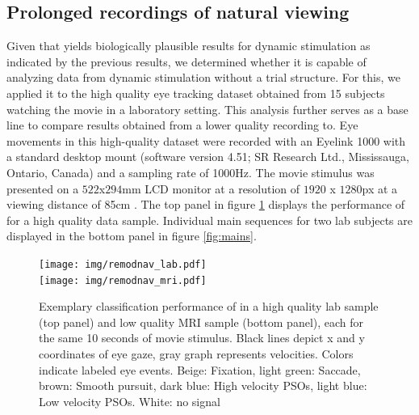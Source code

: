 


    \subsection*{Prolonged recordings of natural viewing}\label{ana_2}


    Given that \remodnav yields biologically plausible results for dynamic stimulation as indicated by the previous
    results, we determined whether it is capable of analyzing data from dynamic stimulation without a trial structure.
    For this, we applied it to the high quality eye tracking dataset obtained from 15 subjects watching the movie in a
    laboratory setting. This analysis further serves as a base line to compare results obtained from a lower quality
    recording to. Eye movements in this high-quality dataset were recorded with an Eyelink 1000 with a standard desktop
    mount (software version 4.51; SR Research Ltd., Mississauga, Ontario, Canada) and a sampling rate of 1000Hz. The
    movie stimulus was presented on a $522$x$294$mm LCD monitor at a resolution of $1920$ x $1280$px at a viewing
    distance of 85cm \citep{Hanke2016}.
    The top panel in figure \ref{fig:remodnav} displays the performance of \remodnav for a high quality data sample.
    Individual main sequences for two lab subjects are displayed in the bottom panel in figure \ref{fig:mains}.\\



    \begin{figure}[h!]
        \texttt{[image: img/remodnav\_lab.pdf]} \\
        \texttt{[image: img/remodnav\_mri.pdf]}\\
        \caption{Exemplary classification performance of \remodnav in a high quality lab sample (top panel) and low
        quality MRI sample (bottom panel), each for the same 10 seconds of movie stimulus.
        Black lines depict x and y coordinates of eye gaze, gray graph represents velocities. Colors indicate labeled
        eye events. Beige: Fixation,
        light green: Saccade, brown: Smooth pursuit, dark blue: High velocity PSOs, light blue: Low velocity PSOs.
        White: no signal}
        \label{fig:remodnav}
    \end{figure}

